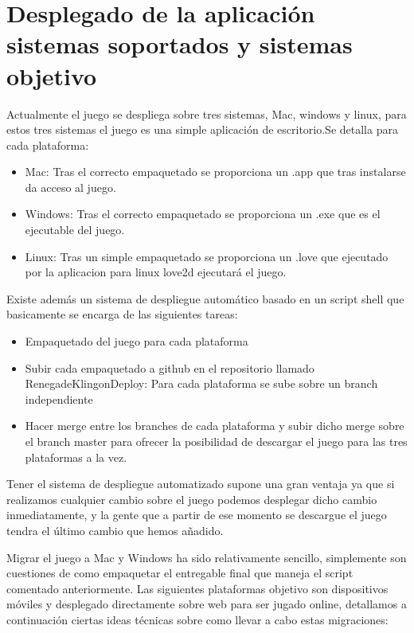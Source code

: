 \section{Desplegado de la aplicación sistemas soportados y sistemas objetivo}

Actualmente el juego se despliega sobre tres sistemas, Mac, windows y linux, para estos tres sistemas el juego es una simple aplicación de escritorio.Se detalla para cada plataforma:

\begin{itemize}

\item Mac: Tras el correcto empaquetado se proporciona un .app que tras instalarse da acceso al juego.

\item Windows:  Tras el correcto empaquetado se proporciona un .exe que es el ejecutable del juego.

\item Linux: Tras un simple empaquetado se proporciona un .love que ejecutado por la aplicacion para linux love2d ejecutará el juego.

\end{itemize}

Existe además un sistema de despliegue automático basado en un script shell que basicamente se encarga de las siguientes tareas:

\begin{itemize}

\item Empaquetado del juego para cada plataforma

\item Subir cada empaquetado a github en el repositorio llamado RenegadeKlingonDeploy: Para cada plataforma se sube sobre un branch independiente

\item Hacer merge entre los branches de cada plataforma y subir dicho merge sobre el branch master para ofrecer la posibilidad de descargar el juego para las tres plataformas a la vez.

\end{itemize}

Tener el sistema de despliegue automatizado supone una gran ventaja ya que si realizamos cualquier cambio sobre el juego podemos desplegar dicho cambio inmediatamente, y la gente que a partir de ese momento se descargue el juego tendra el último cambio que hemos añadido.

Migrar el juego a Mac y Windows ha sido relativamente sencillo, simplemente son cuestiones de como empaquetar el entregable final que maneja el script comentado anteriormente. Las siguientes plataformas objetivo son dispositivos móviles y desplegado directamente sobre web para ser jugado online, detallamos a continuación ciertas ideas técnicas sobre como llevar a cabo estas migraciones:

